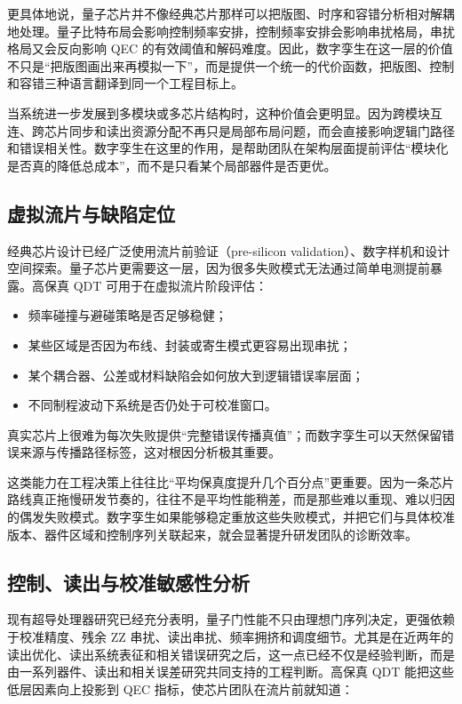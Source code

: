 \documentclass[11pt,a4paper]{article}
\newcommand{\QDT}{QDT}
\newcommand{\QEC}{QEC}
\begin{document}
更具体地说，量子芯片并不像经典芯片那样可以把版图、时序和容错分析相对解耦地处理。量子比特布局会影响控制频率安排，控制频率安排会影响串扰格局，串扰格局又会反向影响 \QEC{} 的有效阈值和解码难度。因此，数字孪生在这一层的价值不只是“把版图画出来再模拟一下”，而是提供一个统一的代价函数，把版图、控制和容错三种语言翻译到同一个工程目标上。

当系统进一步发展到多模块或多芯片结构时，这种价值会更明显。因为跨模块互连、跨芯片同步和读出资源分配不再只是局部布局问题，而会直接影响逻辑门路径和错误相关性。数字孪生在这里的作用，是帮助团队在架构层面提前评估“模块化是否真的降低总成本”，而不是只看某个局部器件是否更优。

\subsection{虚拟流片与缺陷定位}

经典芯片设计已经广泛使用流片前验证（pre-silicon validation）、数字样机和设计空间探索。量子芯片更需要这一层，因为很多失败模式无法通过简单电测提前暴露。高保真 \QDT{} 可用于在虚拟流片阶段评估：

\begin{itemize}
  \item 频率碰撞与避碰策略是否足够稳健；
  \item 某些区域是否因为布线、封装或寄生模式更容易出现串扰；
  \item 某个耦合器、公差或材料缺陷会如何放大到逻辑错误率层面；
  \item 不同制程波动下系统是否仍处于可校准窗口。
\end{itemize}

真实芯片上很难为每次失败提供“完整错误传播真值”；而数字孪生可以天然保留错误来源与传播路径标签，这对根因分析极其重要。

这类能力在工程决策上往往比“平均保真度提升几个百分点”更重要。因为一条芯片路线真正拖慢研发节奏的，往往不是平均性能稍差，而是那些难以重现、难以归因的偶发失败模式。数字孪生如果能够稳定重放这些失败模式，并把它们与具体校准版本、器件区域和控制序列关联起来，就会显著提升研发团队的诊断效率。

\subsection{控制、读出与校准敏感性分析}

现有超导处理器研究已经充分表明，量子门性能不只由理想门序列决定，更强依赖于校准精度、残余 ZZ 串扰、读出串扰、频率拥挤和调度细节。尤其是在近两年的读出优化、读出系统表征和相关错误研究之后，这一点已经不仅是经验判断，而是由一系列器件、读出和相关误差研究共同支持的工程判断。高保真 \QDT{} 能把这些低层因素向上投影到 \QEC{} 指标，使芯片团队在流片前就知道：
\end{document}
